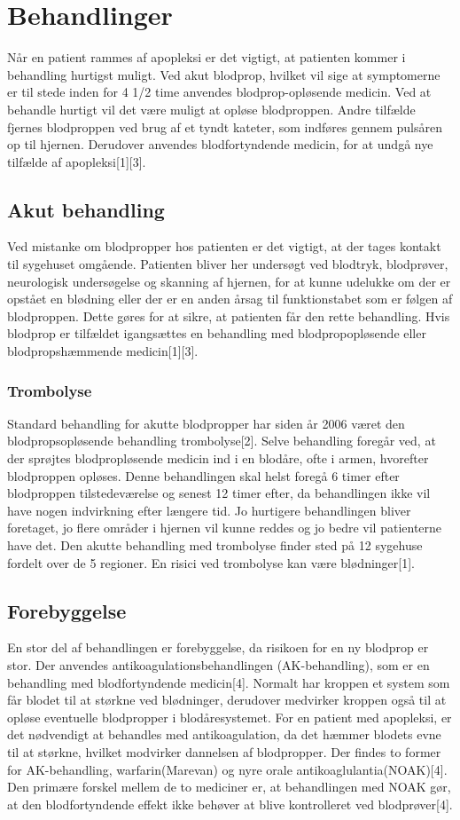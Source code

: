 \section{Behandlinger}
Når en patient rammes af apopleksi er det vigtigt, at patienten kommer i behandling hurtigst muligt. Ved akut blodprop, hvilket vil sige at symptomerne er til stede inden for 4 1/2 time anvendes blodprop-opløsende medicin. Ved at behandle hurtigt vil det være muligt at opløse blodproppen. Andre tilfælde fjernes blodproppen ved brug af et tyndt kateter, som indføres gennem pulsåren op til hjernen. Derudover anvendes blodfortyndende medicin, for at undgå nye tilfælde af apopleksi[1][3].

\subsection{Akut behandling}
Ved mistanke om blodpropper hos patienten er det vigtigt, at der tages kontakt til sygehuset omgående. Patienten bliver her undersøgt ved blodtryk, blodprøver, neurologisk undersøgelse og skanning af hjernen, for at kunne udelukke om der er opstået en blødning eller der er en anden årsag til funktionstabet som er følgen af blodproppen. Dette gøres for at sikre, at patienten får den rette behandling. Hvis blodprop er tilfældet igangsættes en behandling med blodpropopløsende eller blodpropshæmmende medicin[1][3]. 

\subsubsection{Trombolyse}
Standard behandling for akutte blodpropper har siden år 2006 været den blodpropsopløsende behandling trombolyse[2]. Selve behandling foregår ved, at der sprøjtes blodpropløsende medicin ind i en blodåre, ofte i armen, hvorefter blodproppen opløses. Denne behandlingen skal helst foregå 6 timer efter blodproppen tilstedeværelse og senest 12 timer efter, da behandlingen ikke vil have nogen indvirkning efter længere tid. Jo hurtigere behandlingen bliver foretaget, jo flere områder i hjernen vil kunne reddes og jo bedre vil patienterne have det. Den akutte behandling med trombolyse finder sted på 12 sygehuse fordelt over de 5 regioner. En risici ved trombolyse kan være blødninger[1]. 

\subsection{Forebyggelse}
En stor del af behandlingen er forebyggelse, da risikoen for en ny blodprop er stor. Der anvendes antikoagulationsbehandlingen (AK-behandling), som er en behandling med blodfortyndende medicin[4]. Normalt har kroppen et system som får blodet til at størkne ved blødninger, derudover medvirker kroppen også til at opløse eventuelle blodpropper i blodåresystemet. For en patient med apopleksi, er det nødvendigt at behandles med antikoagulation, da det hæmmer blodets evne til at størkne, hvilket modvirker dannelsen af blodpropper. Der findes to former for AK-behandling, warfarin(Marevan) og nyre orale antikoaglulantia(NOAK)[4]. Den primære forskel mellem de to mediciner er, at behandlingen med NOAK gør, at den blodfortyndende effekt ikke behøver at blive kontrolleret ved blodprøver[4].

